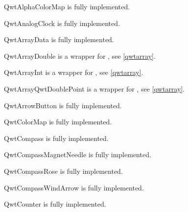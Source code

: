 \documentclass{manual}
\begin{document}
\begin{classdesc*}{QwtAlphaColorMap}
  is fully implemented.
\end{classdesc*}

\begin{classdesc*}{QwtAnalogClock}
  is fully implemented.
\end{classdesc*}

\begin{classdesc*}{QwtArrayData}
  is fully implemented.
\end{classdesc*}

\begin{classdesc*}{QwtArrayDouble}
  is a wrapper for , see \ref{qwtarray}.
\end{classdesc*}

\begin{classdesc*}{QwtArrayInt}
  is a wrapper for , see \ref{qwtarray}.
\end{classdesc*}

\begin{classdesc*}{QwtArrayQwtDoublePoint}
  is a wrapper for , see \ref{qwtarray}.
\end{classdesc*}

\begin{classdesc*}{QwtArrowButton}
  is fully implemented.
\end{classdesc*}

\begin{classdesc*}{QwtColorMap}
  is fully implemented.
\end{classdesc*}

\begin{classdesc*}{QwtCompass}
  is fully implemented.
\end{classdesc*}

\begin{classdesc*}{QwtCompassMagnetNeedle}
  is fully implemented.
\end{classdesc*}

\begin{classdesc*}{QwtCompassRose}
  is fully implemented.
\end{classdesc*}

\begin{classdesc*}{QwtCompassWindArrow}
  is fully implemented.
\end{classdesc*}

\begin{classdesc*}{QwtCounter}
  is fully implemented.
\end{classdesc*}
\end{document}
